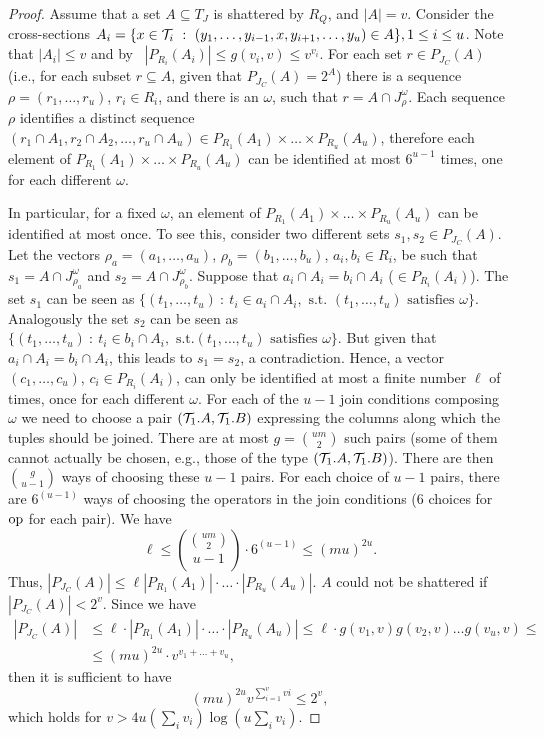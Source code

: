 \begin{proof}
Assume that a set $A\subseteq T_J$ is shattered by $R_Q$, and $|A|=v$. Consider
the cross-sections $A_i=\{x\in{\cal T}_i ~:~
(y_1,\dots,y_{i-1},x,y_{i+1},\dots,y_u)\in A\}, 1\le i\le u$.  Note that
$|A_i|\leq v$ and by~\citep[Coroll.~14.4.3]{AlonS08} %
$|P_{R_i} (A_i)|\leq g(v_i,v)
 \le v^{v_i}$. For each set $r \in P_{J_C}(A)$
(i.e., for each subset $r\subseteq A$, given that $P_{J_C}(A)=2^A$)  there is a
sequence $\rho=(r_1,\dots,r_u)$, $r_i\in R_i$, and there is an $\omega$, such
that $r = A \cap J^{\omega}_{\rho}$. Each sequence $\rho$ identifies a distinct
sequence $(r_1\cap A_1, r_2\cap A_2, \dots, r_u\cap A_u) \in
P_{R_1}(A_1)\times\dots\times P_{R_u}(A_u)$, therefore each element of
$P_{R_1}(A_1)\times \dots\times P_{R_u}(A_u)$ can be identified at most
$6^{u-1}$ times, one for each different $\omega$.

In particular, for a fixed $\omega$, an element of $P_{R_1}(A_1)\times
\dots\times P_{R_u}(A_u)$ can be identified at most once.
To see this, consider two different sets $s_1, s_2 \in
P_{J_C}(A)$. Let the vectors $\rho_a=(a_1,\dots,a_u)$,
$\rho_b=(b_1,\dots,b_u)$, $a_i,b_i\in R_i$, be such that $s_1 = A \cap
J^{\omega}_{\rho_a}$ and $s_2 = A \cap
J^{\omega}_{\rho_b}$. Suppose that $a_i\cap A_i = b_i\cap A_i$  ($\in
P_{R_i}(A_i)$). The set $s_1$ can be seen as $\{(t_1,\dots,t_u) ~:~ t_i\in a_i\cap
A_i,\mbox{ s.t. } (t_1,\dots,t_u) \mbox{ satisfies } \omega\}$. Analogously the
set $s_2$ can be seen as $\{(t_1,\dots, t_u) ~:~ t_i\in b_i\cap A_i, \mbox{ s.t.
} (t_1,\dots,t_u) \mbox{ satisfies } \omega\}$. But given that $a_i\cap A_i =
b_i\cap A_i$, this leads to $s_1=s_2$, a contradiction. Hence, a vector 
$(c_1,\dots,c_u)$, $c_i\in P_{R_i}(A_i)$, can only be identified at most a
finite number $\ell$ of times, once for each different $\omega$. For each of the $u-1$ join conditions
composing $\omega$ we need to choose a pair $({\cal T}_1.A,{\cal T}_1.B)$ expressing the
columns along which the tuples should be joined. There are at most $g=\binom{um}{2}$
such pairs (some of them cannot actually be chosen, e.g., those of the type
$({\cal T}_1.A, {\cal T}_1.B)$). There are then $\binom{g}{u-1}$ ways of choosing these
$u-1$ pairs. For each choice of $u-1$ pairs, there are $6^{(u-1)}$ ways of
choosing the operators in the join conditions ($6$ choices for $\operatorname{op}$ for each
pair). We have
\[
\ell\le \binom{\binom{um}{2}}{u-1}\cdot6^{(u-1)}\le (mu)^{2u}.
\]
Thus, $|P_{J_C} (A)|\leq \ell|P_{R_1} (A_1)|\cdot \dots \cdot|P_{R_u} (A_u)|$.
$A$ could not be shattered if $|P_{J_C}(A)|< 2^v$. Since we have
\begin{align*}
|P_{J_C} (A)| &\leq \ell\cdot|P_{R_1} (A_1)|\cdot \dots\cdot |P_{R_u} (A_u)|\leq
\ell\cdot g(v_1,v)g(v_2,v)\dots g(v_u,v) \leq \\
&\leq (mu)^{2u} \cdot v^{v_1+\dots+v_u}, %
\end{align*}
then it is sufficient to have 
\[
(mu)^{2u}v^{\sum_{i=1}^v vi}\le 2^v,
\]
which holds for $v> 4u\left(\sum_i v_i\right)\log (u\sum_i v_i)$.
\end{proof}

